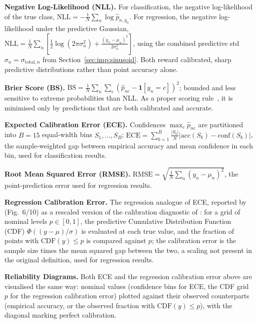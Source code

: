 \documentclass[conference]{IEEEtran}
\begin{document}
\label{sec:metrics}

\textbf{Negative Log-Likelihood (NLL).} For classification, the negative log-likelihood of
the true class, $\mathrm{NLL}=-\frac{1}{N}\sum_n\log\hat{p}_{n,y_n}$. For regression, the
negative log-likelihood under the predictive Gaussian,
$\mathrm{NLL}=\frac{1}{N}\sum_n\left[\frac{1}{2}\log(2\pi\sigma_n^2)+\frac{(y_n-\mu_n)^2}{2\sigma_n^2}\right]$,
using the combined predictive std $\sigma_n=\sigma_{\text{total},n}$ from
Section~\ref{sec:imp:sinusoid}. Both reward calibrated, sharp predictive distributions
rather than point accuracy alone.

\textbf{Brier Score (BS).}
$\mathrm{BS}=\frac{1}{N}\sum_n\sum_c(\hat{p}_{nc}-\mathbf{1}[y_n=c])^2$; bounded and less
sensitive to extreme probabilities than NLL. As a proper scoring
rule~\citep{murphy2023pml}, it is minimised only by predictions that are both calibrated
and accurate.

\textbf{Expected Calibration Error (ECE).} Confidences $\max_c\hat p_{nc}$ are partitioned
into $B=15$ equal-width bins $S_1,\dots,S_B$;
$\mathrm{ECE}=\sum_{b=1}^{B}\frac{|S_b|}{N}\left|\mathrm{acc}(S_b)-\mathrm{conf}(S_b)\right|$,
the sample-weighted gap between empirical accuracy and mean confidence in each bin, used for
classification results.

\textbf{Root Mean Squared Error (RMSE).}
$\mathrm{RMSE}=\sqrt{\frac{1}{N}\sum_n(y_n-\mu_n)^2}$, the point-prediction error used for
regression results.

\textbf{Regression Calibration Error.} The regression analogue of ECE, reported by
\citet{daxberger2021laplace} (Fig.\ 6/10) as a rescaled version of the calibration
diagnostic of \citet{kuleshov2018calibrated}: for a grid of nominal levels $p\in[0,1]$, the
predictive Cumulative Distribution Function (CDF) $\Phi((y-\mu)/\sigma)$ is evaluated at
each true value, and the fraction of points with $\mathrm{CDF}(y)\leq p$ is compared against
$p$; the calibration error is the
sample size times the mean squared gap between the two, a scaling not present in the
original definition, used for regression results.

\textbf{Reliability Diagrams.} Both ECE and the regression calibration error above are
visualised the same way: nominal values (confidence bins for ECE, the CDF grid $p$ for the
regression calibration error) plotted against their observed counterparts (empirical
accuracy, or the observed fraction with $\mathrm{CDF}(y)\leq p$), with the diagonal marking
perfect calibration.
\end{document}
